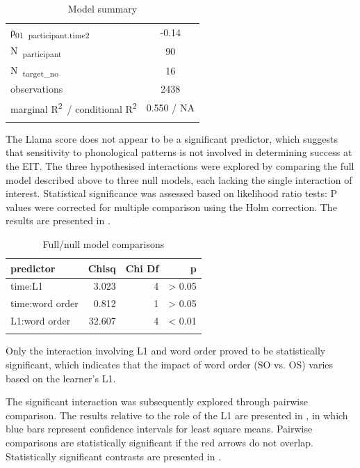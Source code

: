 \begin{table}
\begin{tabularx}{\textwidth}{Xrrr}
    ρ\textsubscript{01}~\textsubscript{participant.time2} & \multicolumn{3}{c}{{}-0.14}\\
    N~\textsubscript{participant} & \multicolumn{3}{c}{90}\\
    N~\textsubscript{target\_no} & \multicolumn{3}{c}{16}\\
    \midrule
    observations & \multicolumn{3}{c}{2438}\\
    marginal R\textsuperscript{2}~/ conditional R\textsuperscript{2} & \multicolumn{3}{c}{0.550 / NA}\\
    \lspbottomrule
    \end{tabularx}
    \caption{Model summary}
    \label{tab:04:3}
\end{table}

The Llama score does not appear to be a significant predictor, which suggests that sensitivity to phonological patterns is not involved in determining success at the EIT. The three hypothesised interactions were explored by comparing the full model described above to three null models, each lacking the single interaction of interest. Statistical significance was assessed based on likelihood ratio tests: P values were corrected for multiple comparison using the Holm correction. The results are presented in .

\begin{table}
    \begin{tabularx}{.8\textwidth}{Xrrr}
    \lsptoprule
    predictor & Chisq & Chi Df & p\\
    \midrule
    time:L1 & 3.023 & 4 & > 0.05\\
    time:word order & 0.812 & 1 & > 0.05\\
    L1:word order & 32.607 & 4 & < 0.01\\
    \lspbottomrule
    \end{tabularx}
    \caption{Full/null model comparisons}
    \label{tab:04:4}
\end{table}

Only the interaction involving L1 and word order proved to be statistically significant, which indicates that the impact of word order (SO vs. OS) varies based on the learner’s L1. 

The significant interaction was subsequently explored through pairwise comparison. The results relative to the role of the L1 are presented in , in which blue bars represent confidence intervals for least square means. Pairwise comparisons are statistically significant if the red arrows do not overlap. Statistically significant contrasts are presented in .

